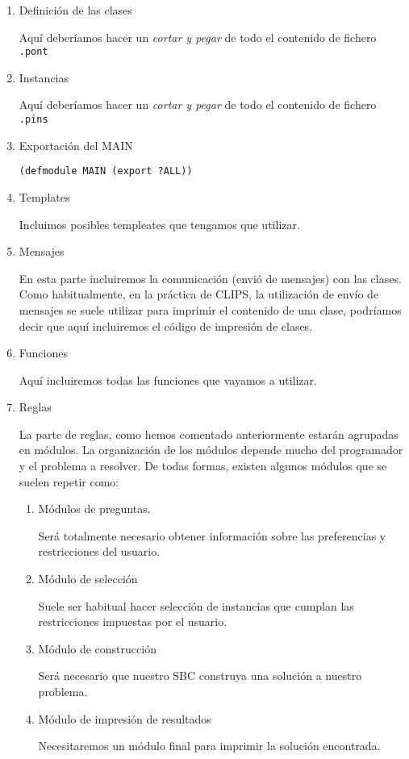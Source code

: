 \documentclass[11pt,svgnames]{scrbook}
\begin{document}
\begin{enumerate}
 \item Definición de las clases

Aquí deberíamos hacer un \textit{ cortar y pegar} de todo el contenido de fichero \texttt{.pont}

\item  Instancias

Aquí deberíamos hacer un \textit{ cortar y pegar} de todo el contenido de fichero \texttt{.pins}

\item  Exportación del MAIN

\texttt{(defmodule MAIN (export ?ALL))}

\item Templates

Incluimos posibles templeates que tengamos que utilizar.

\item  Mensajes

En esta parte incluiremos la comunicación (envió de mensajes) con las clases. Como habitualmente, en la práctica de CLIPS, la utilización de envío de mensajes  se suele utilizar para imprimir  el contenido de una clase, podríamos decir que aquí incluiremos el  código de impresión de clases.

\item  Funciones

 Aquí incluiremos todas las funciones que vayamos a utilizar.

\item  Reglas

 La parte de reglas, como hemos comentado anteriormente estarán agrupadas en módulos.
 La organización de los módulos depende mucho del programador y el problema a resolver.
 De todas formas, existen algunos módulos que se suelen repetir como:

\begin{enumerate}
 \item Módulos de preguntas.

 Será totalmente necesario obtener información sobre las preferencias y restricciones del usuario.

\item Módulo de selección

 Suele ser habitual hacer selección de instancias que cumplan las restricciones impuestas por el usuario.

\item Módulo de construcción

 Será necesario que nuestro SBC construya una solución a nuestro problema.

\item Módulo de impresión de resultados

 Necesitaremos un módulo final para imprimir la solución encontrada.
\end{enumerate}

\end{enumerate}
\end{document}
